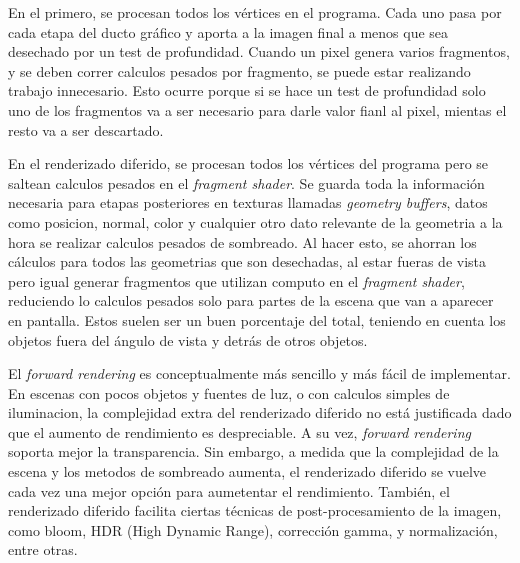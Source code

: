 En el primero, se procesan todos los vértices en el programa.
Cada uno pasa por cada etapa del ducto gráfico y aporta a la imagen final a menos que sea desechado por un test de profundidad.
Cuando un pixel genera varios fragmentos, y se deben correr calculos pesados por fragmento, se puede estar realizando trabajo innecesario. Esto ocurre porque si se hace un test de profundidad solo uno de los fragmentos va a ser necesario para darle valor fianl al pixel, mientas el resto va a ser descartado.

En el renderizado diferido, se procesan todos los vértices del programa pero se saltean calculos pesados en el \textit{fragment shader}.
Se guarda toda la información necesaria para etapas posteriores en texturas llamadas \textit{geometry buffers}, datos como posicion, normal, color y cualquier otro dato relevante de la geometria a la hora se realizar calculos pesados de sombreado.
Al hacer esto, se ahorran los cálculos para todos las geometrias que son desechadas, al estar fueras de vista pero igual generar fragmentos que utilizan computo en el \textit{fragment shader}, reduciendo lo calculos pesados solo para partes de la escena que van a aparecer en pantalla. %
Estos suelen ser un buen porcentaje del total, teniendo en cuenta los objetos fuera del ángulo de vista y detrás de otros objetos.

El \textit{forward rendering} es conceptualmente más sencillo y más fácil de implementar.
En escenas con pocos objetos y fuentes de luz, o con calculos simples de iluminacion, la complejidad extra del renderizado diferido no está justificada dado que el aumento de rendimiento es despreciable.
A su vez, \textit{forward rendering} soporta mejor la transparencia.
Sin embargo, a medida que la complejidad de la escena y los metodos de sombreado aumenta, el renderizado diferido se vuelve cada vez una mejor opción para aumetentar el rendimiento.
También, el renderizado diferido facilita ciertas técnicas de post-procesamiento de la imagen, como bloom, HDR (High Dynamic Range), corrección gamma, y normalización, entre otras.



